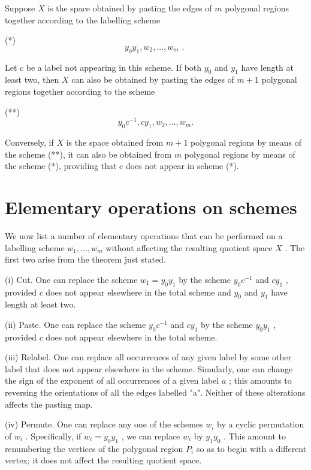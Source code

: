 \begin{theorem} Suppose \(X\) is the space obtained by pasting the edges of \(m\) polygonal regions together according to the labelling scheme

(*)
\[
{y}_{0}{y}_{1},{w}_{2},\ldots ,{w}_{m}\text{ . }
\]

Let \(c\) be a label not appearing in this scheme. If both \({y}_{0}\) and \({y}_{1}\) have length at least two, then \(X\) can also be obtained by pasting the edges of \(m + 1\) polygonal regions together according to the scheme

(**)
\[
{y}_{0}{c}^{-1},c{y}_{1},{w}_{2},\ldots ,{w}_{m}.
\]

Conversely, if \(X\) is the space obtained from \(m + 1\) polygonal regions by means of the scheme (**), it can also be obtained from \(m\) polygonal regions by means of the scheme (*), providing that c does not appear in scheme (*).

\section*{Elementary operations on schemes}

We now list a number of elementary operations that can be performed on a labelling scheme \({w}_{1},\ldots ,{w}_{m}\) without affecting the resulting quotient space \(X\) . The first two arise from the theorem just stated.

(i) Cut. One can replace the scheme \({w}_{1} = {y}_{0}{y}_{1}\) by the scheme \({y}_{0}{c}^{-1}\) and \(c{y}_{1}\) , provided \(c\) does not appear elsewhere in the total scheme and \({y}_{0}\) and \({y}_{1}\) have length at least two.

(ii) Paste. One can replace the scheme \({y}_{0}{c}^{-1}\) and \(c{y}_{1}\) by the scheme \({y}_{0}{y}_{1}\) , provided \(c\) does not appear elsewhere in the total scheme.

(iii) Relabel. One can replace all occurrences of any given label by some other label that does not appear elsewhere in the scheme. Simularly, one can change the sign of the exponent of all occurrences of a given label \(a\) ; this amounts to reversing the orientations of all the edges labelled "a". Neither of these alterations affects the pasting map.

(iv) Permute. One can replace any one of the schemes \({w}_{i}\) by a cyclic permutation of \({w}_{i}\) . Specifically, if \({w}_{i} = {y}_{0}{y}_{1}\) , we can replace \({w}_{i}\) by \({y}_{1}{y}_{0}\) . This amount to renumbering the vertices of the polygonal region \({P}_{i}\) so as to begin with a different vertex; it does not affect the resulting quotient space.


\end{theorem}
